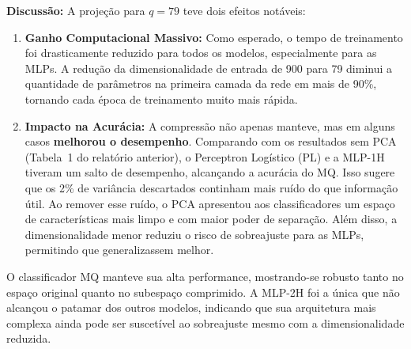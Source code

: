 \documentclass[a4paper,12pt]{article}
\begin{document}
\begin{table}[h!]
\centering
\caption{Resultados com PCA e redução de dimensionalidade para \(q=79\).}
\label{tab:tabela3}
\end{table}

\noindent\textbf{Discussão:} A projeção para \(q=79\) teve dois efeitos notáveis:

\begin{enumerate}
    \item \textbf{Ganho Computacional Massivo:} Como esperado, o tempo de treinamento foi drasticamente reduzido para todos os modelos, especialmente para as MLPs. A redução da dimensionalidade de entrada de 900 para 79 diminui a quantidade de parâmetros na primeira camada da rede em mais de 90\%, tornando cada época de treinamento muito mais rápida.

    \item \textbf{Impacto na Acurácia:} A compressão não apenas manteve, mas em alguns casos \textbf{melhorou o desempenho}. Comparando com os resultados sem PCA (Tabela~1 do relatório anterior), o Perceptron Logístico (PL) e a MLP-1H tiveram um salto de desempenho, alcançando a acurácia do MQ. Isso sugere que os 2\% de variância descartados continham mais ruído do que informação útil. Ao remover esse ruído, o PCA apresentou aos classificadores um espaço de características mais limpo e com maior poder de separação. Além disso, a dimensionalidade menor reduziu o risco de sobreajuste para as MLPs, permitindo que generalizassem melhor.
\end{enumerate}

O classificador MQ manteve sua alta performance, mostrando-se robusto tanto no espaço original quanto no subespaço comprimido. A MLP-2H foi a única que não alcançou o patamar dos outros modelos, indicando que sua arquitetura mais complexa ainda pode ser suscetível ao sobreajuste mesmo com a dimensionalidade reduzida.
\end{document}
